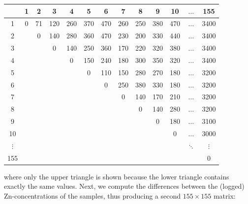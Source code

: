 \begin{center}
\begin{tabular}{c|cccccccccccc}
~  &  1 & 2 & 3 &  4  &  5  &  6  &  7  &  8  &  9 &  10 & $\ldots$ & 155 \\ \hline
1  &  0 &71 & 120 & 260 & 370 & 470 & 260 & 250 & 380 & 470 & $\ldots$ &3400 \\
2  &  ~ & 0 &140& 280 & 360 & 470 & 230 & 200 & 330 & 440 & $\ldots$ &3400 \\
3  &  ~ & ~ & 0 & 140 & 250 & 360 & 170 & 220 & 320 & 380 & $\ldots$ &3400 \\
4  &  ~ & ~ & ~ &  0  & 150 & 240 & 180 & 300 & 350 & 320 & $\ldots$ &3400 \\
5  &  ~ & ~ & ~ & ~   &  0  & 110 & 150 & 280 & 270 & 180 & $\ldots$ &3200 \\
6  &  ~ & ~ & ~ & ~   & ~   &  0 & 250 & 380 & 330 & 180 & $\ldots$ &3200 \\
7  &  ~ & ~ & ~ & ~   & ~   & ~  &  0 & 140 & 170 & 210 & $\ldots$ &3200 \\
8  &  ~ & ~ & ~ & ~   & ~   & ~  & ~  &  0  & 140 & 280 & $\ldots$ &3200 \\
9  &  ~ & ~ & ~ & ~   & ~   & ~  & ~  & ~   &  0  & 180 & $\ldots$ &3100 \\
10 &  ~ & ~ & ~ & ~   & ~   & ~  & ~  & ~   & ~   & 0   & $\ldots$ &3000 \\
$\vdots$ & ~   & ~ & ~ & ~ & ~ & ~ & ~ &
~ & ~   & ~ & $\ddots$ & $\vdots$ \\
155 & ~ & ~ & ~ & ~   & ~ & ~ & ~ & ~ & ~ & ~ & ~ & 0
\end{tabular}
\end{center}

\noindent where only the upper triangle is shown because the lower
triangle contains exactly the same values. Next, we compute the
differences between the (logged) Zn-concentrations of the samples,
thus producing a second $155\times{155}$ matrix:

